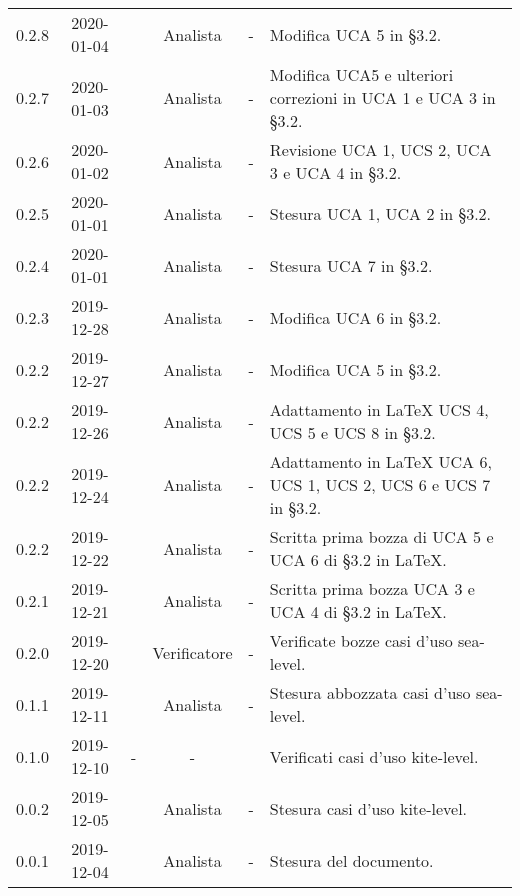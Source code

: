 {\begin{longtable}{ c c  C{2.3cm} c C{3cm} C{3.2cm}}
0.2.8 & 2020-01-04 & \CE{} & Analista & - & Modifica UCA 5 in §3.2. \\

0.2.7 & 2020-01-03 & \CE{} & Analista & - & Modifica UCA5 e ulteriori correzioni in UCA 1 e UCA 3 in §3.2. \\

0.2.6 & 2020-01-02 & \CE{} & Analista & - & Revisione UCA 1, UCS 2, UCA 3 e UCA 4 in §3.2. \\

0.2.5 & 2020-01-01 & \BR{} & Analista & - & Stesura UCA 1, UCA 2 in §3.2. \\

0.2.4 & 2020-01-01 & \PF{} & Analista & - & Stesura UCA 7 in §3.2. \\

0.2.3 & 2019-12-28 & \DF{} & Analista & - & Modifica UCA 6 in §3.2. \\

0.2.2 & 2019-12-27 & \PF{} & Analista & - & Modifica UCA 5 in §3.2. \\

0.2.2 & 2019-12-26 & \CE{} & Analista & - & Adattamento in \LaTeX{} UCS 4, UCS 5 e UCS 8 in §3.2. \\

0.2.2 & 2019-12-24 & \DF{} & Analista & - & Adattamento in \LaTeX{} UCA 6, UCS 1, UCS 2, UCS 6 e UCS 7 in §3.2. \\

0.2.2 & 2019-12-22 & \PF{} & Analista & - & Scritta prima bozza di UCA 5 e UCA 6 di §3.2 in \LaTeX. \\

0.2.1 & 2019-12-21 & \PF{} & Analista & - & Scritta prima bozza UCA 3 e UCA 4 di §3.2 in \LaTeX. \\

0.2.0 & 2019-12-20 & \SE{} & Verificatore & - & Verificate bozze casi d'uso sea-level. \\

0.1.1 & 2019-12-11 & \DF{} & Analista & - & Stesura abbozzata casi d'uso sea-level. \\

0.1.0 & 2019-12-10 & - & - & \BR{} & Verificati casi d'uso kite-level. \\

0.0.2 & 2019-12-05 & \CE{} & Analista & - & Stesura casi d'uso kite-level. \\

0.0.1 & 2019-12-04 & \CE{} & Analista & - & Stesura del documento. \\		
		
\end{longtable}
}